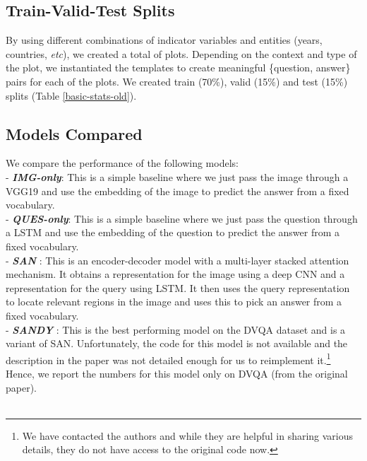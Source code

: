 \documentclass[10pt,twocolumn,letterpaper]{article}
\begin{document}
\subsection{Train-Valid-Test Splits} 
By using different combinations of  indicator variables and  entities (years, countries, \textit{etc}), we created a total of  plots. 
Depending on the context and type of the plot, we instantiated the  templates to create meaningful \{question, answer\} pairs for each of the plots. 
We created train (70\%), valid (15\%) and test (15\%) splits (Table \ref{basic-stats-old}). 

\subsection{Models Compared}
We compare the performance of the following models:\\
\noindent - \textit{\textbf{IMG-only}}: This is a simple baseline where we just pass the image through a VGG19 and use the embedding of the image to predict the answer from a fixed vocabulary.\\
\noindent - \textit{\textbf{QUES-only}}: This is a simple baseline where we just pass the question through a LSTM and use the embedding of the question to predict the answer from a fixed vocabulary.\\ 
\noindent - \textit{\textbf{SAN}} \cite{SAN}: This is an encoder-decoder model with a multi-layer stacked attention \cite{Attention} mechanism. It obtains a representation for the image using a deep CNN and a representation for the query using LSTM. It then uses the query representation to locate relevant regions in the image and uses this to pick an answer from a fixed vocabulary.\\
\noindent - \textit{\textbf{SANDY}} \cite{DVQA}: This is the best performing model on the DVQA dataset and is a variant of SAN. Unfortunately, the code for this model is not available and the description in the paper was not detailed enough for us to reimplement it.\footnote{We have contacted the authors and while they are helpful in sharing various details, they do not have access to the original code now.} Hence, we report the numbers for this model only on DVQA (from the original paper).\\
\\
\end{document}
